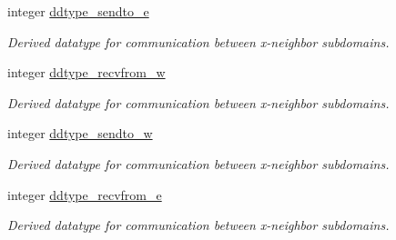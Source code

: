 \textbf{ }\par
\begin{DoxyCompactItemize}
\item 
integer \mbox{\hyperlink{namespacemodule__mpi__subdomain_a17fa32eaf9dfe52b13cc7f17572a63be}{ddtype\+\_\+sendto\+\_\+e}}
\begin{DoxyCompactList}\small\item\em Derived datatype for communication between x-\/neighbor subdomains. \end{DoxyCompactList}\item 
integer \mbox{\hyperlink{namespacemodule__mpi__subdomain_a8422fcfc17adb1bdf04f2b7ca08003c2}{ddtype\+\_\+recvfrom\+\_\+w}}
\begin{DoxyCompactList}\small\item\em Derived datatype for communication between x-\/neighbor subdomains. \end{DoxyCompactList}\item 
integer \mbox{\hyperlink{namespacemodule__mpi__subdomain_a9ca276bc5dcbfd8fcb5b8173e66dba07}{ddtype\+\_\+sendto\+\_\+w}}
\begin{DoxyCompactList}\small\item\em Derived datatype for communication between x-\/neighbor subdomains. \end{DoxyCompactList}\item 
integer \mbox{\hyperlink{namespacemodule__mpi__subdomain_ab6299920e9e9fe15e9936e4be0bcfe7a}{ddtype\+\_\+recvfrom\+\_\+e}}
\begin{DoxyCompactList}\small\item\em Derived datatype for communication between x-\/neighbor subdomains. \end{DoxyCompactList}\end{DoxyCompactItemize}

